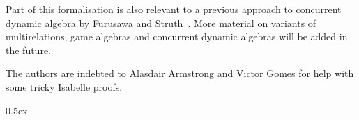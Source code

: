 \documentclass[11pt,a4paper]{article}
\begin{document}
Part of this formalisation is also relevant to a previous approach to
concurrent dynamic algebra by Furusawa and
Struth~\cite{FurusawaS15b}. More material on variants of
multirelations, game algebras and concurrent dynamic algebras will be
added in the future.

The authors are indebted to Alasdair Armstrong and Victor Gomes for
help with some tricky Isabelle proofs.

\parindent 0pt\parskip 0.5ex





\end{document}
